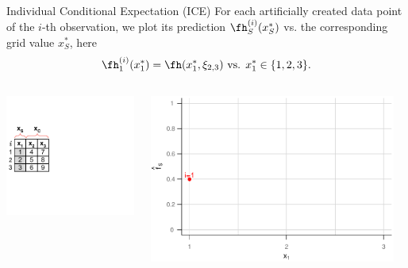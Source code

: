 \documentclass[11pt,compress,t,notes=noshow, aspectratio=169, xcolor=table]{beamer}
\begin{document}
\begin{vbframe}{Individual Conditional Expectation (ICE)}
For each artificially created data point of the $i$-th observation, we plot its prediction $\fh_{S}^{(i)}(x_S^*)$ vs. the corresponding grid value $x_S^*$, here $$\fh_{1}^{(i)}(x_1^*) = \fh(x_1^*, \xi_{2, 3}) \text{ vs. } x_1^* \in \{1, 2, 3\}.$$


\framebreak

\begin{columns}[T]
\begin{column}{0.45\textwidth}
\includegraphics[page=4, trim=0cm 0.35cm 0.85cm 0.35cm, width=\textwidth]{figure_man/ice_plot_demo}
\end{column}
\begin{column}{0.55\textwidth}
\includegraphics[page=2, width=0.95\textwidth]{figure/ICE}
\end{column}
\end{columns}
\vspace*{\topsep}


\end{vbframe}
\end{document}
